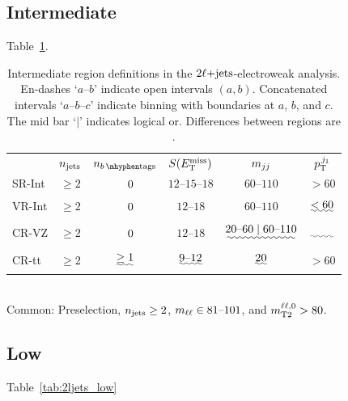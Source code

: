 \subsection{Intermediate}
\label{sec:2ljets_int}


Table~\ref{tab:2ljets_int}.


\begin{table}[tp]
\centering
\begin{tabular}{lccccc}
& $n_\mathrm{jets}$
& $\nbtag$
& $S(E_\mathrm{T}^\mathrm{miss})$
& $m_{jj}$
& $p_\mathrm{T}^{\,j_1}$
\\[1em]
SR-Int
& $\geq 2$
& $\hphantom{\geq}~0$
& $12\textrm{--}15\textrm{--}18$
& $60\textrm{--}110$
& $> 60$
\\[.5em]
\: VR-Int
& $\geq 2$
& $\hphantom{\geq}~0$
& $12\textrm{--}18$
& $60\textrm{--}110$
& $\uwave{< 60}$
\\[1em]
CR-VZ
& $\geq 2$
& $\hphantom{\geq}~0$
& $12\textrm{--}18$
& $\uwave{20\textrm{--}60 \mid 60\textrm{--}110}$
& $\uwave{\hphantom{< 60}}$
\\[.5em]
CR-tt
& $\geq 2$
& $\uwave{\geq 1}$
& $\uwave{9\textrm{--}12}$
& $\uwave{20}$
& $> 60$
\end{tabular}
\\[1em]
Common: Preselection,
$n_\mathrm{jets} \geq 2$,
$m_{\ell\ell} \in 81\textrm{--}101$, and
$m_\mathrm{T2}^{\ell\ell,0} > 80$.
\caption{%
Intermediate region definitions in the $2\ell\mathrm{+jets}$-electroweak analysis.
En-dashes `$a\textrm{--}b$' indicate open intervals $(a, b)$.
Concatenated intervals `$a\textrm{--}b\textrm{--}c$' indicate binning
with boundaries at $a$, $b$, and $c$.
The mid bar `$\mid$' indicates logical or.
Differences between regions are .
}
\label{tab:2ljets_int}
\end{table}


\subsection{Low}
\label{sec:2ljets_low}


Table~\ref{tab:2ljets_low}

